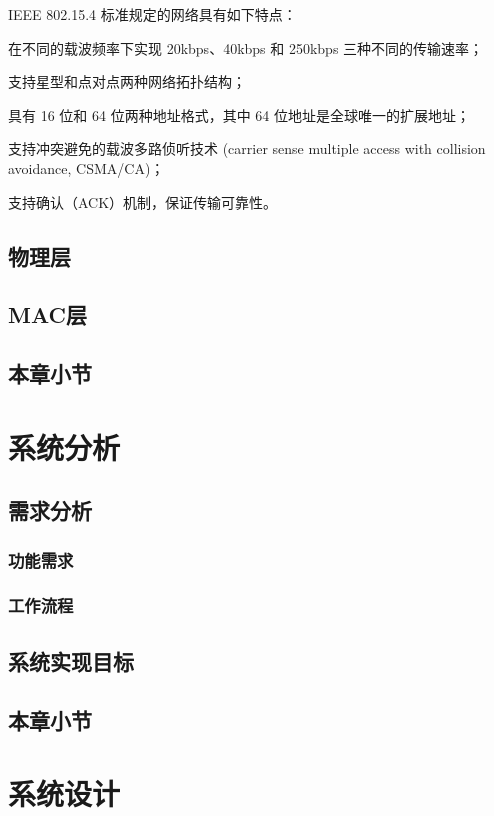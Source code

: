IEEE 802.15.4 标准规定的网络具有如下特点：
\begin{compactitem}
\item 在不同的载波频率下实现 20kbps、40kbps 和 250kbps 三种不同的传输速率；
\item 支持星型和点对点两种网络拓扑结构；
\item 具有 16 位和 64 位两种地址格式，其中 64 位地址是全球唯一的扩展地址；
\item 支持冲突避免的载波多路侦听技术 (carrier sense multiple access with collision avoidance, CSMA/CA)；
\item 支持确认（ACK）机制，保证传输可靠性。
\end{compactitem}

\section{物理层}
\section{MAC层}
\section{本章小节}

\chapter{系统分析}
\section{需求分析}
\subsection{功能需求}
\subsection{工作流程}

\section{系统实现目标}

\section{本章小节}


\chapter{系统设计}
